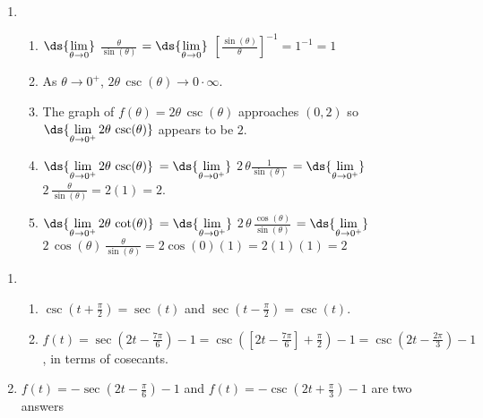 \documentclass{ximera}
\begin{document}
\begin{enumerate}
\setcounter{enumi}{\value{HW}}

\item \begin{enumerate} \item $\ds{\lim_{\theta \rightarrow 0}}$ $\frac{\theta}{\sin(\theta)}$ $ = \ds{\lim_{\theta \rightarrow 0}}$ $\left[\frac{\sin(\theta)}{\theta}\right]^{-1} = 1^{-1} = 1$

\smallskip


\item   As $\theta \rightarrow 0^{+}$, $2 \theta \, \csc(\theta) \rightarrow 0 \cdot \infty$.

\smallskip

\item  The graph of  $f(\theta) = 2 \theta \, \csc(\theta)$ approaches $(0,2)$ so  $\ds{\lim_{\theta \rightarrow 0^{+}} 2 \theta \, \csc(\theta)}$ appears to be $2$.

\smallskip

\item  $\ds{\lim_{\theta \rightarrow 0^{+}} 2 \theta \, \csc(\theta)}$ $= \ds{\lim_{\theta \rightarrow 0^{+}}}$ $2 \, \theta \frac{1}{\sin(\theta)}$ $= \ds{\lim_{\theta \rightarrow 0^{+}}}$ $2 \, \frac{\theta}{\sin(\theta)} = 2(1) = 2$.

\item $\ds{\lim_{\theta \rightarrow 0^{+}} 2 \theta \, \cot(\theta)}$ $= \ds{\lim_{\theta \rightarrow 0^{+}}}$ $2 \, \theta \, \frac{\cos(\theta)}{\sin(\theta)}$  $= \ds{\lim_{\theta \rightarrow 0^{+}}}$ $2 \, \cos(\theta) \, \frac{\theta}{\sin(\theta)} = 2\cos(0)(1) = 2(1)(1) = 2$

\end{enumerate}

\setcounter{HW}{\value{enumi}}
\end{enumerate}

\begin{enumerate}
\setcounter{enumi}{\value{HW}}

\item   \begin{enumerate} \item  $\csc\left(t + \frac{\pi}{2} \right) = \sec(t)$ and $\sec\left(t - \frac{\pi}{2} \right) = \csc(t)$.

\item  $f(t) = \sec\left( 2 t - \frac{7\pi}{6} \right) -1 = \csc\left( \left[2 t - \frac{7\pi}{6}\right] + \frac{\pi}{2}  \right) -1 = \csc\left( 2 t - \frac{2\pi}{3} \right) -1 $, in terms of cosecants.

\end{enumerate}

\item  $f(t) = - \sec\left(2t - \frac{\pi}{6} \right)-1$ and  $f(t) = -\csc\left(2t + \frac{\pi}{3} \right) -1$ are two answers

\setcounter{HW}{\value{enumi}}
\end{enumerate}
\end{document}
